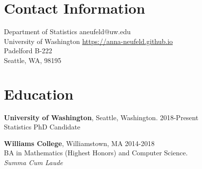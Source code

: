 \documentclass[margin, 10pt]{res} %
\begin{document}
\begin{resume}

 

\section{Contact Information}
Department of Statistics \hfill  aneufeld@uw.edu\\
University of Washington \hfill \href{https://anna-neufeld.github.io}{https://anna-neufeld.github.io} \\
Padelford B-222  \hfill \\
Seattle, WA, 98195



\section{Education} 

{\textbf{University of Washington},} Seattle, Washington. \hfill 2018-Present \\
Statistics PhD Candidate %

{\textbf{Williams College}}, Williamstown, MA \hfill 2014-2018  \\
BA in Mathematics (Highest Honors) and Computer Science. \\ 
\textit{Summa Cum Laude}%
 

\end{resume}
\end{document}
